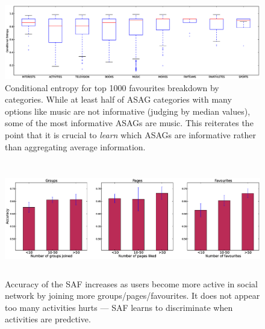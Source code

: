 \begin{figure}[tbph!]
\hspace{-12mm}\includegraphics[width=200mm]{data/plots/boxPlots/CEvsFavTypes.eps}
\vspace{-7mm}
\caption{Conditional entropy for top 1000 favourites breakdown by categories.  While
at least half of ASAG categories
with many options like music are not informative (judging by median values), 
some of the most informative ASAGs are music.  This reiterates
the point that it is crucial to \emph{learn} which ASAGs 
are informative rather than aggregating average information.}
\label{Fig5}
\end{figure}


\begin{figure}[tbh!]
\centering
\includegraphics[width=180mm, height=50mm]{data/plots/new/accuracyVsmembership.eps}
\vspace{-6mm}
\caption{Accuracy of the SAF increases as users become more active in social network by joining more groups/pages/favourites.  It does not appear too many activities hurts --- SAF learns to discriminate when activities are predctive.}
\label{AccuracyVsmembership}
\end{figure}

